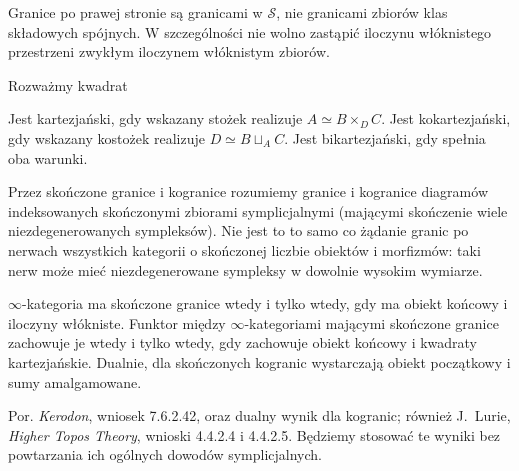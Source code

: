 Granice po prawej stronie są granicami w $\mathcal S$, nie granicami zbiorów klas składowych spójnych. W szczególności nie wolno zastąpić iloczynu włóknistego przestrzeni zwykłym iloczynem włóknistym zbiorów.

\begin{definicja}\label{cat:def:stable-bicartesian}
Rozważmy kwadrat
\begin{center}
\end{center}
Jest kartezjański, gdy wskazany stożek realizuje $A\simeq B\times_D C$. Jest kokartezjański, gdy wskazany kostożek realizuje $D\simeq B\sqcup_A C$. Jest bikartezjański, gdy spełnia oba warunki.
\end{definicja}

Przez skończone granice i kogranice rozumiemy granice i kogranice diagramów indeksowanych skończonymi zbiorami symplicjalnymi (mającymi skończenie wiele niezdegenerowanych sympleksów). Nie jest to to samo co żądanie granic po nerwach wszystkich kategorii o skończonej liczbie obiektów i morfizmów: taki nerw może mieć niezdegenerowane sympleksy w dowolnie wysokim wymiarze.

\begin{twierdzenie}\label{cat:thm:stable-finite-limit-generation}
$\infty$-kategoria ma skończone granice wtedy i tylko wtedy, gdy ma obiekt końcowy i iloczyny włókniste. Funktor między $\infty$-kategoriami mającymi skończone granice zachowuje je wtedy i tylko wtedy, gdy zachowuje obiekt końcowy i kwadraty kartezjańskie. Dualnie, dla skończonych kogranic wystarczają obiekt początkowy i sumy amalgamowane.
\end{twierdzenie}
Por. \emph{Kerodon}, wniosek 7.6.2.42, oraz dualny wynik dla kogranic; również J.~Lurie, \emph{Higher Topos Theory}, wnioski 4.4.2.4 i 4.4.2.5. Będziemy stosować te wyniki bez powtarzania ich ogólnych dowodów symplicjalnych.

